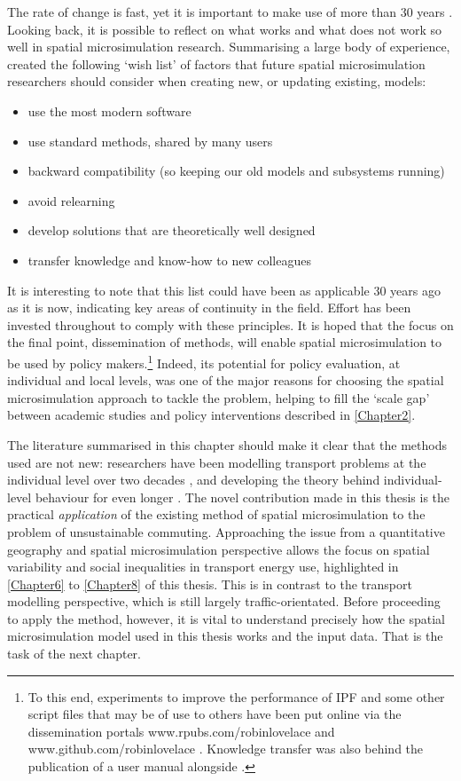 The rate of change is fast, yet it is important to make use of more than 30 years
. Looking back, it is possible to reflect
on what works and what does not work so well in spatial microsimulation
research. Summarising a large body of experience,
\citet[p.~197]{Holm2013-design-principles} created the following `wish list' of
factors that future spatial microsimulation researchers should consider
when creating new, or updating existing, models:
\begin{itemize}
\item  use the most modern software
\item  use standard methods, shared by many users
\item  backward compatibility (so keeping our old models and subsystems running)
\item  avoid relearning
\item  develop solutions that are theoretically well designed
\item  transfer knowledge and know-how to new colleagues
\end{itemize}
It is interesting to note that this list could have been as applicable 30 years
ago as it is now, indicating key areas of continuity in the field.
Effort has been invested throughout to comply with these
principles. It is hoped that the focus on the final point, dissemination of methods,
will enable spatial microsimulation to be used by policy
makers.\footnote{To
this end, experiments to improve the performance of IPF and some other
script files that may be of use to others
have been put online via the dissemination portals www.rpubs.com/robinlovelace
and www.github.com/robinlovelace . Knowledge transfer was also behind the
publication of a user manual alongside \citet{Lovelace2013-trs}.
}
Indeed,
its potential for policy evaluation, at individual and local levels, was
one of the major reasons for choosing the spatial microsimulation approach
to tackle the problem, helping to fill the `scale gap' between academic
studies and policy interventions described in \cref{Chapter2}.

The literature summarised in this chapter should make it clear that
the methods used are not new: researchers have been modelling
transport problems at the individual level over two decades \citep{Ortuzar1982},
and developing the theory behind individual-level behaviour for even longer
\citep{Wilson1970}.
The novel
contribution made in this thesis is the practical \emph{application} of
the existing method of spatial microsimulation to the problem of unsustainable
commuting. Approaching the issue from a quantitative geography and spatial
microsimulation perspective allows the focus on spatial
variability and social inequalities in transport energy use, highlighted in
\cref{Chapter6} to \cref{Chapter8} of this thesis. This is in contrast to the 
transport modelling perspective, which is still largely traffic-orientated.
Before proceeding to apply
the method, however, it is vital to understand precisely how the
spatial microsimulation model used in this thesis works and the input data.
That is the task of the next chapter.



